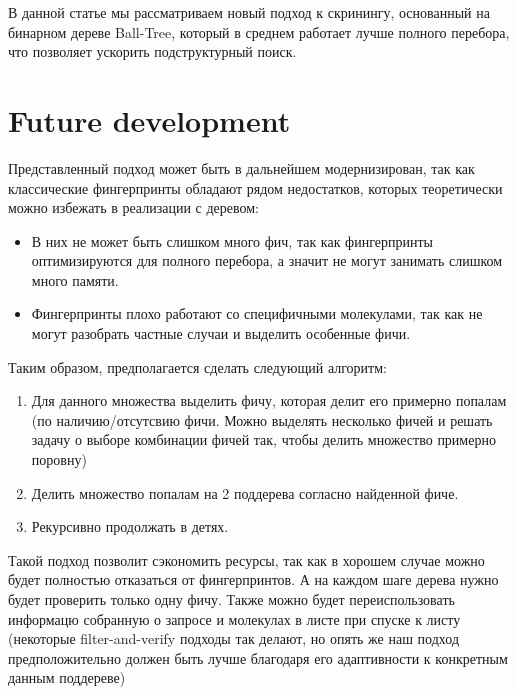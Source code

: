 В данной статье мы рассматриваем новый подход к скринингу, основанный на бинарном дереве Ball-Tree, который в среднем работает лучше полного перебора, что позволяет ускорить подструктурный поиск. 

\section{Future development}

Представленный подход может быть в дальнейшем модернизирован, так как классические фингерпринты обладают рядом недостатков, которых теоретически можно избежать в реализации с деревом:  

\begin{itemize}
  \item В них не может быть слишком много фич, так как фингерпринты оптимизируются для полного перебора, а значит не могут занимать слишком много памяти.  
  \item Фингерпринты плохо работают со специфичными молекулами, так как не могут разобрать частные случаи и выделить особенные фичи.  
\end{itemize}

Таким образом, предполагается сделать следующий алгоритм:

\begin{enumerate}
  \item Для данного множества выделить фичу, которая делит его примерно попалам (по наличию/отсутсвию фичи. Можно выделять несколько фичей и решать задачу о выборе комбинации фичей так, чтобы делить множество примерно поровну)
  \item Делить множество попалам на 2 поддерева согласно найденной фиче.
  \item Рекурсивно продолжать в детях. 
\end{enumerate}

Такой подход позволит сэкономить ресурсы, так как в хорошем случае можно будет полностью отказаться от фингерпринтов. А на каждом шаге дерева нужно будет проверить только одну фичу. Также можно будет переиспользовать информацю собранную о запросе и молекулах в листе при спуске к листу (некоторые filter-and-verify подходы так делают, но опять же наш подход предположительно должен быть лучше благодаря его адаптивности к конкретным данным поддереве)
